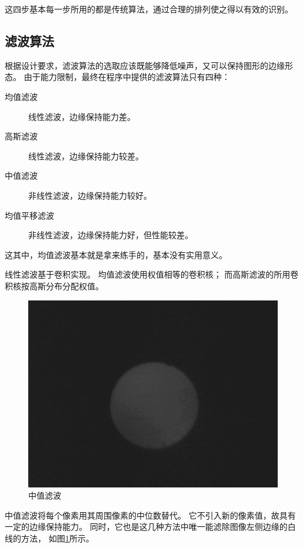 \documentclass[12pt,a4paper]{article}
\begin{document}
这四步基本每一步所用的都是传统算法，通过合理的排列使之得以有效的识别。

\subsection{滤波算法}

根据设计要求，滤波算法的选取应该既能够降低噪声，又可以保持图形的边缘形态。
由于能力限制，最终在程序中提供的滤波算法只有四种：
\begin{description}
    \item[均值滤波] 线性滤波，边缘保持能力差。
    \item[高斯滤波] 线性滤波，边缘保持能力较差。
    \item[中值滤波] 非线性滤波，边缘保持能力较好。
    \item[均值平移滤波] 非线性滤波，边缘保持能力好，但性能较差。
\end{description}
这其中，均值滤波基本就是拿来练手的，基本没有实用意义。

线性滤波基于卷积\cite{KernelWiki}实现。
均值滤波使用权值相等的卷积核；
而高斯滤波的所用卷积核按高斯分布分配权值。

\begin{figure}[!htb]
    \centering
    \includegraphics[width = 0.6\linewidth]{median.png}
    \caption{中值滤波}\label{fig:median}
\end{figure}

中值滤波将每个像素用其周围像素的中位数替代。
它不引入新的像素值，故具有一定的边缘保持能力。
同时，它也是这几种方法中唯一能滤除图像左侧边缘的白线的方法，
如图\ref{fig:median}所示。
\end{document}
